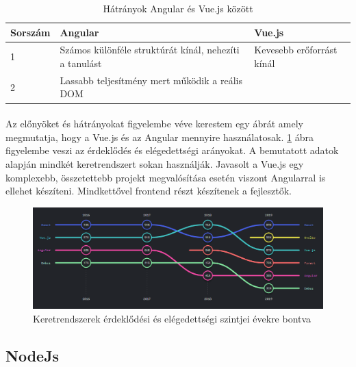 	\begin{table}[H]
	\begin{footnotesize}
		\begin{center}
			\caption{Hátrányok Angular és Vue.js között \cite{vuevsang}}
			\label{tab:table2}
			\begin{tabular}{p{2cm}|p{6cm}|p{6cm}} 
				\textbf{Sorszám} & \textbf{Angular} & \textbf{Vue.js}\\
				\hline
				1 & Számos különféle struktúrát kínál, nehezíti a tanulást & Kevesebb erőforrást kínál\\
				\hline
				2 & Lassabb teljesítmény mert működik a reális DOM &  \\
			\end{tabular}
		\end{center}
	\end{footnotesize}
	\end{table}
	\paragraph{}
	Az előnyöket és hátrányokat figyelembe véve kerestem egy ábrát amely megmutatja, hogy a Vue.js és az Angular mennyire használatosak. \ref{fig:vueang} ábra figyelembe veszi az érdeklődés és elégedettségi arányokat. A bemutatott adatok alapján mindkét keretrendszert sokan használják. Javasolt a Vue.js egy komplexebb, összetettebb projekt megvalósítása esetén viszont Angularral is ellehet készíteni. Mindkettővel frontend részt készítenek a fejlesztők.
	
	\begin{figure}
		\centering
		\includegraphics[scale=0.6]{figures/images/vueang.png}
		\caption{Keretrendszerek érdeklődési és elégedettségi szintjei évekre bontva \cite{vueanginterest}}
		\label{fig:vueang}
	\end{figure}
	
	\subsection{NodeJs}
